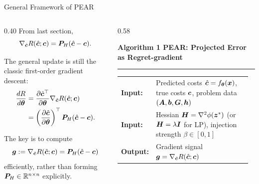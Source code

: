 \documentclass[10pt,aspectratio=169,xcolor=dvipsnames]{beamer}
\begin{document}
\begin{frame}{General Framework of PEAR}
    \begin{columns}[T,onlytextwidth]
        \begin{column}{0.40\textwidth}
            \small
            From last section,
            \[
                \nabla_{\hat{{\bm{c}}}}R(\hat{{\bm{c}}};{\bm{c}})
                ={\bm{P}}_H(\hat{{\bm{c}}}-{\bm{c}}).
            \]

            The general update is still the classic first-order gradient descent:
            {\footnotesize
            \begin{equation}
                \begin{aligned}
                    \frac{dR}{d{\bm{\theta}}}
                    &=\frac{\partial\hat{{\bm{c}}}^{\top}}{\partial{\bm{\theta}}}
                      \nabla_{\hat{{\bm{c}}}}R(\hat{{\bm{c}}};{\bm{c}})\\
                    &=\left(\frac{\partial\hat{{\bm{c}}}}{\partial{\bm{\theta}}}\right)^{\top}
                      {\bm{P}}_H(\hat{{\bm{c}}}-{\bm{c}}).
                \end{aligned}
            \end{equation}}

            The key is to compute
            \[
                {\bm{g}}:=\nabla_{\hat{{\bm{c}}}}R(\hat{{\bm{c}}};{\bm{c}})
                ={\bm{P}}_H(\hat{{\bm{c}}}-{\bm{c}})
            \]
            efficiently, rather than forming
            ${\bm{P}}_H\in\mathbb{R}^{n\times n}$ explicitly.
        \end{column}

        \begin{column}{0.58\textwidth}
            {\fontsize{7.2}{8.3}\selectfont
            \textbf{Algorithm 1 PEAR: Projected Error as Regret-gradient}\par
            \vspace{0.1em}
            \hrule
            \vspace{0.25em}

            {\fontsize{5.9}{7}\selectfont
            \begin{tabular}{@{}p{0.12\linewidth}p{0.83\linewidth}@{}}
                \textbf{Input:} & Predicted costs $\hat{{\bm{c}}}=f_{{\bm{\theta}}}({\bm{x}})$,
                true costs ${\bm{c}}$, problem data $({\bm{A}},{\bm{b}},{\bm{G}},{\bm{h}})$\\
                \textbf{Input:} & Hessian ${\bm{H}}=\nabla^2\phi({\bm{z}}^*)$
                (or ${\bm{H}}=\lambda{\bm{I}}$ for LP), injection strength $\beta\in[0,1]$\\
                \textbf{Output:} & Gradient signal
                ${\bm{g}}=\nabla_{\hat{{\bm{c}}}}R(\hat{{\bm{c}}};{\bm{c}})$
            \end{tabular}}

}
\end{column}
\end{columns}
\end{frame}
\end{document}
